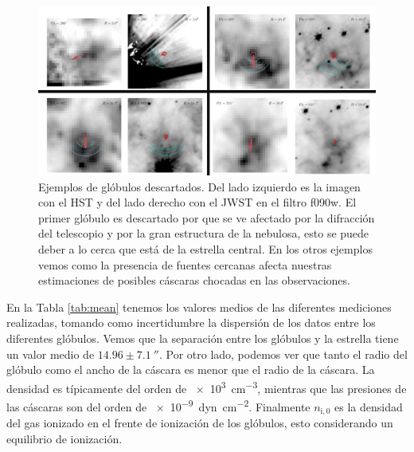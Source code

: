 \documentclass{book}
\begin{document}
\begin{figure}[htb]
    \centering
    \includegraphics[width=\textwidth]{Nuevas imagenes finales/Malos_ajustes_final.pdf}
    \caption{Ejemplos de glóbulos descartados. Del lado izquierdo es la imagen con el HST y del lado derecho con el JWST en el filtro f090w. El primer glóbulo es descartado por que se ve afectado por la difracción del telescopio y por la gran estructura de la nebulosa, esto se puede deber a lo cerca que está de la estrella central. En los otros ejemplos vemos como la presencia de fuentes cercanas afecta nuestras estimaciones de posibles cáscaras chocadas en las observaciones.}
    \label{Bad Globules}
\end{figure}

En la Tabla \ref{tab:mean} tenemos los valores medios de las diferentes mediciones realizadas, tomando como incertidumbre la dispersión de los datos entre los diferentes glóbulos. Vemos que la separación entre los glóbulos y la estrella tiene un valor medio de $14.96\pm\SI{7.1}{\arcsecond}$. Por otro lado, podemos ver que tanto el radio del glóbulo como el ancho de la cáscara es menor que el radio de la cáscara. La densidad es típicamente del orden de \SI{e3}{cm^{-3}}, mientras que las presiones de las cáscaras son del orden de \SI{e-9}{dyn.cm^{-2}}. Finalmente $n_\mathrm{i,0}$ es la densidad del gas ionizado en el frente de ionización de los glóbulos,  esto considerando un equilibrio de ionización.
\end{document}
